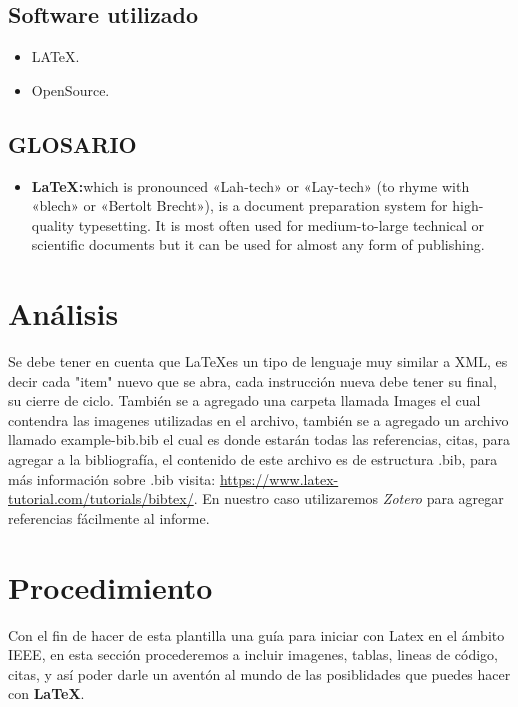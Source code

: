 \documentclass[journal, spanish]{IEEEtran}
\begin{document}
\subsection{\bf Software utilizado}
\begin{itemize}
    \item LATeX.
    \item OpenSource.
\end{itemize}
\subsection{\bf GLOSARIO}
\begin{itemize}
    \item {\bf LaTeX:}which is pronounced «Lah-tech» or «Lay-tech» (to rhyme with «blech» or «Bertolt Brecht»), is a document preparation system for high-quality typesetting. It is most often used for medium-to-large technical or scientific documents but it can be used for almost any form of publishing.
\end{itemize}
\section{Análisis}

Se debe tener en cuenta que \LaTeX es un tipo de lenguaje muy similar a XML, es decir cada "item" nuevo que se abra, cada instrucción nueva debe tener su final, su cierre de ciclo. También se a agregado una carpeta llamada Images el cual contendra las imagenes utilizadas en el archivo, también se a agregado un archivo llamado example-bib.bib el cual es donde estarán todas las referencias, citas, para agregar a la bibliografía, el contenido de este archivo es de estructura .bib, para más información sobre .bib visita: \url{https://www.latex-tutorial.com/tutorials/bibtex/}. En nuestro caso utilizaremos \textit{Zotero} para agregar referencias fácilmente al informe.

\section{Procedimiento}
Con el fin de hacer de esta plantilla una guía para iniciar con Latex en el ámbito IEEE, en esta sección procederemos a incluir imagenes, tablas, lineas de código, citas, y así poder darle un aventón al mundo de las posiblidades que puedes hacer con \textbf{\LaTeX}.
\end{document}
